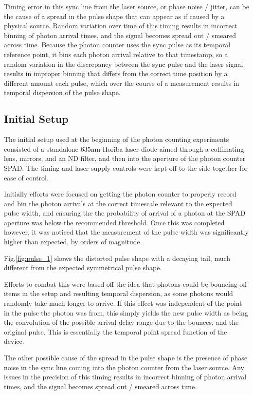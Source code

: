 \documentclass[a4paper]{article}
\begin{document}
Timing error in this sync line from the laser source, or phase noise / jitter, can be the cause of a spread in the pulse shape that can appear as if caused by a physical source. Random variation over time of this timing results in incorrect binning of photon arrival times, and the signal becomes spread out / smeared across time. Because the photon counter uses the sync pulse as its temporal reference point, it bins each photon arrival relative to that timestamp, so a random variation in the discrepancy between the sync pulse and the laser signal results in improper binning that differs from the correct time position by a different amount each pulse, which over the course of a measurement results in temporal dispersion of the pulse shape.

\subsection{Initial Setup}
The initial setup used at the beginning of the photon counting experiments consisted of a standalone 635nm Horiba laser diode aimed through a collimating lens, mirrors, and an ND filter, and then into the aperture of the photon counter SPAD. The timing and laser supply controls were kept off to the side together for ease of control.

Initially efforts were focused on getting the photon counter to properly record and bin the photon arrivals at the correct timescale relevant to the expected pulse width, and ensuring the the probability of arrival of a photon at the SPAD aperture was below the recommended threshold. Once this was completed however, it was noticed that the measurement of the pulse width was significantly higher than expected, by orders of magnitude.

Fig.\ref{fig:pulse_1} shows the distorted pulse shape with a decaying tail, much different from the expected symmetrical pulse shape.

Efforts to combat this were based off the idea that photons could be bouncing off items in the setup and resulting temporal dispersion, as some photons would randomly take much longer to arrive. If this effect was independent of the point in the pulse the photon was from, this simply yields the new pulse width as being the convolution of the possible arrival delay range due to the bounces, and the original pulse. This is essentially the temporal point spread function of the device.

The other possible cause of the spread in the pulse shape is the presence of phase noise in the sync line coming into the photon counter from the laser source. Any issues in the precision of this timing results in incorrect binning of photon arrival times, and the signal becomes spread out / smeared across time.
\end{document}
